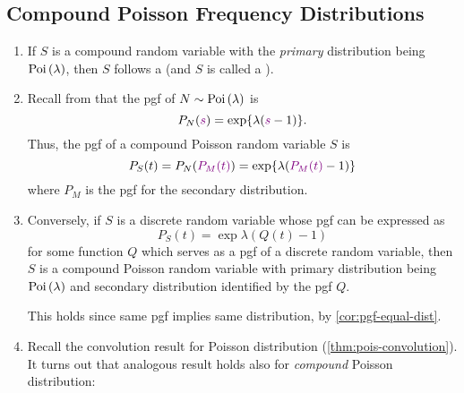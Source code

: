 \subsection{Compound Poisson Frequency Distributions}
\begin{enumerate}
\item If \(S\) is a compound random variable with the \emph{primary}
distribution being \(\operatorname{Poi}\left(\lambda\right)\), then \(S\) follows a  (and \(S\) is called a ).

\item \label{it:cpd-pois-pgf}
Recall from  that the pgf of
\(N\sim\operatorname{Poi}\left(\lambda\right)\) is
\[
P_N({\color{violet}s})=\exp{\lambda({\color{violet}s}-1)}.
\]
Thus, the pgf of a compound Poisson random variable \(S\) is
\[
P_S(t)=P_N({\color{violet}P_M(t)})=\exp{\lambda({\color{violet}P_M(t)}-1)}
\]
where \(P_M\) is the pgf for the secondary distribution.

\item \label{it:pgf-expr-for-cpd-pois}
Conversely, if \(S\) is a discrete random variable whose pgf can be
expressed as
\[
P_S(t)=\exp{\lambda(Q(t)-1)}
\]
for some function \(Q\) which serves as a pgf of a discrete random variable,
then \(S\) is a compound Poisson random variable with primary distribution
being \(\operatorname{Poi}\left(\lambda\right)\) and secondary distribution identified by the pgf
\(Q\).

\begin{note}
This holds since same pgf implies same distribution, by
\cref{cor:pgf-equal-dist}.
\end{note}

\item Recall the convolution result for Poisson distribution
(\cref{thm:pois-convolution}). It turns out that analogous result holds also
for \emph{compound} Poisson distribution:


\end{enumerate}
